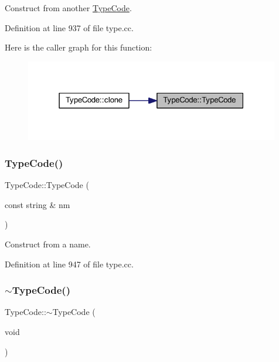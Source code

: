 Construct from another \mbox{\hyperlink{class_type_code}{Type\+Code}}. 



Definition at line 937 of file type.\+cc.

Here is the caller graph for this function\+:
\nopagebreak
\begin{figure}[H]
\begin{center}
\leavevmode
\includegraphics[width=315pt]{class_type_code_a85184f290572a138c890d7d5035c8fdc_icgraph}
\end{center}
\end{figure}
\mbox{\label{class_type_code_aea0c166ae7ae389f37808b17e58b582a}} 
\subsubsection{\texorpdfstring{TypeCode()}{TypeCode()}\hspace{0.1cm}{\footnotesize\ttfamily [2/2]}}
{\footnotesize\ttfamily Type\+Code\+::\+Type\+Code (\begin{DoxyParamCaption}\item[{const string \&}]{nm }\end{DoxyParamCaption})}



Construct from a name. 



Definition at line 947 of file type.\+cc.

\mbox{\label{class_type_code_a616085985a512843cec883203879b4c5}} 
\subsubsection{\texorpdfstring{$\sim$TypeCode()}{~TypeCode()}}
{\footnotesize\ttfamily Type\+Code\+::$\sim$\+Type\+Code (\begin{DoxyParamCaption}\item[{void}]{ }\end{DoxyParamCaption})\hspace{0.3cm}{\ttfamily [virtual]}}



